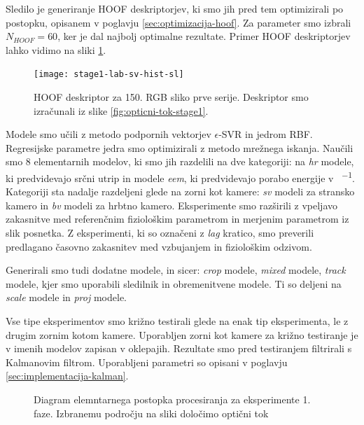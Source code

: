 Sledilo je generiranje HOOF deskriptorjev, ki smo jih pred tem optimizirali po postopku, opisanem v poglavju \ref{sec:optimizacija-hoof}. Za parameter smo izbrali $N_{HOOF} = 60 $, ker je dal najbolj optimalne rezultate. Primer HOOF deskriptorjev lahko vidimo na sliki \ref{fig:hoof-znacilke}.

\begin{figure}[!htb]
	\centering
	\texttt{[image: stage1-lab-sv-hist-sl]}
	\caption[HOOF deskriptor za 150. RGB sliko prve serije]{HOOF deskriptor za 150. RGB sliko prve serije. Deskriptor smo izračunali iz slike \ref{fig:opticni-tok-stage1}.}
	\label{fig:hoof-znacilke}
\end{figure}

Modele smo učili z metodo podpornih vektorjev $\epsilon$-SVR in jedrom RBF. Regresijske parametre jedra smo optimizirali z metodo mrežnega iskanja. Naučili smo \num{8} elementarnih modelov, ki smo jih razdelili na dve kategoriji: na \textit{hr} modele, ki predvidevajo srčni utrip in modele \textit{eem}, ki predvidevajo porabo energije v \si{\kcal\per\min}. Kategoriji sta nadalje razdeljeni glede na zorni kot kamere: \textit{sv} modeli za stransko kamero in \textit{bv} modeli za hrbtno kamero. Eksperimente smo razširili z vpeljavo zakasnitve med referenčnim fiziološkim parametrom in merjenim parametrom iz slik posnetka. Z eksperimenti, ki so označeni z \textit{lag} kratico, smo preverili predlagano časovno zakasnitev med vzbujanjem in fiziološkim odzivom. 

Generirali smo tudi dodatne modele, in sicer: \textit{crop} modele, \textit{mixed} modele, \textit{track} modele, kjer smo uporabili sledilnik in obremenitvene modele. Ti so deljeni na \textit{scale} modele in \textit{proj} modele.

Vse tipe eksperimentov smo križno testirali glede na enak tip eksperimenta, le z drugim zornim kotom kamere. Uporabljen zorni kot kamere za križno testiranje je v imenih modelov zapisan v oklepajih. Rezultate smo pred testiranjem filtrirali s Kalmanovim filtrom. Uporabljeni parametri so opisani v poglavju \ref{sec:implementacija-kalman}.


\begin{figure}[!htb]
	\centering
	
	\caption[Diagram elemntarnega postopka procesiranja za eksperimente 1. faze]{Diagram elemntarnega postopka procesiranja za eksperimente 1. faze. Izbranemu področju na sliki določimo optični tok }
	\label{fig:diagram-procesiranja-stage1}
\end{figure}

